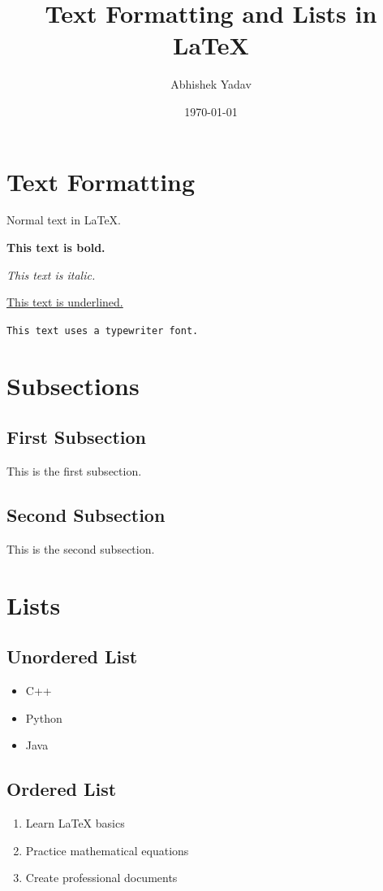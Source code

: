 \documentclass{article}
\title{Text Formatting and Lists in LaTeX}
\author{Abhishek Yadav}
\date{\today}
\begin{document}
\maketitle

\section{Text Formatting}

Normal text in LaTeX.

\textbf{This text is bold.}

\textit{This text is italic.}

\underline{This text is underlined.}

\texttt{This text uses a typewriter font.}

\section{Subsections}

\subsection{First Subsection}
This is the first subsection.

\subsection{Second Subsection}
This is the second subsection.

\section{Lists}

\subsection{Unordered List}

\begin{itemize}
    \item C++
    \item Python
    \item Java
\end{itemize}

\subsection{Ordered List}

\begin{enumerate}
    \item Learn LaTeX basics
    \item Practice mathematical equations
    \item Create professional documents
\end{enumerate}
\end{document}
